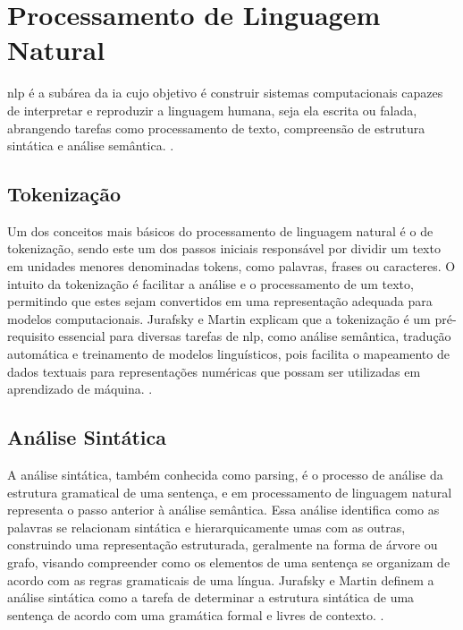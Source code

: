 \section{Processamento de Linguagem Natural}\label{subsec:nlp}

\gls{nlp} é a subárea da \gls{ia} cujo objetivo é construir sistemas computacionais capazes de interpretar e reproduzir a linguagem humana, seja ela escrita ou falada, abrangendo tarefas como processamento de texto, compreensão de estrutura sintática e análise semântica. \cite{JurafskyMartin2023}.

\subsection{Tokenização}\label{subsec:nlp1}

Um dos conceitos mais básicos do processamento de linguagem natural é o de tokenização, sendo este um dos passos iniciais responsável por dividir um texto em unidades menores denominadas tokens, como palavras, frases ou caracteres. O intuito da tokenização é facilitar a análise e o processamento de um texto, permitindo que estes sejam convertidos em uma representação adequada para modelos computacionais. Jurafsky e Martin explicam que a tokenização é um pré-requisito essencial para diversas tarefas de \gls{nlp}, como análise semântica, tradução automática e treinamento de modelos linguísticos, pois facilita o mapeamento de dados textuais para representações numéricas que possam ser utilizadas em aprendizado de máquina. \cite{JurafskyMartin2023}.

\subsection{Análise Sintática}\label{subsec:nlp2}

A análise sintática, também conhecida como parsing, é o processo de análise da estrutura gramatical de uma sentença, e em processamento de linguagem natural representa o passo anterior à análise semântica. Essa análise identifica como as palavras se relacionam sintática e hierarquicamente umas com as outras, construindo uma representação estruturada, geralmente na forma de árvore ou grafo, visando compreender como os elementos de uma sentença se organizam de acordo com as regras gramaticais de uma língua. Jurafsky e Martin definem a análise sintática como a tarefa de determinar a estrutura sintática de uma sentença de acordo com uma gramática formal e livres de contexto. \cite{JurafskyMartin2023}.

